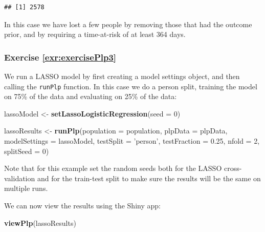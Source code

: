 \documentclass[11pt]{book}
\newenvironment{Shaded}{\begin{snugshade}}{\end{snugshade}}
\newcommand{\KeywordTok}[1]{\textcolor[rgb]{0.13,0.29,0.53}{\textbf{#1}}}
\newcommand{\DataTypeTok}[1]{\textcolor[rgb]{0.13,0.29,0.53}{#1}}
\newcommand{\DecValTok}[1]{\textcolor[rgb]{0.00,0.00,0.81}{#1}}
\newcommand{\FloatTok}[1]{\textcolor[rgb]{0.00,0.00,0.81}{#1}}
\newcommand{\StringTok}[1]{\textcolor[rgb]{0.31,0.60,0.02}{#1}}
\newcommand{\NormalTok}[1]{#1}
\theoremstyle{definition}
\theoremstyle{definition}
\theoremstyle{definition}
\theoremstyle{remark}
\begin{document}
\begin{verbatim}
## [1] 2578
\end{verbatim}

In this case we have lost a few people by removing those that had the
outcome prior, and by requiring a time-at-risk of at least 364 days.

\subsubsection*{Exercise
\ref{exr:exercisePlp3}}\label{exercise-refexrexerciseplp3}

We run a LASSO model by first creating a model settings object, and then
calling the \texttt{runPlp} function. In this case we do a person split,
training the model on 75\% of the data and evaluating on 25\% of the
data:

\begin{Shaded}
\begin{Highlighting}[]
\NormalTok{lassoModel <-}\StringTok{ }\KeywordTok{setLassoLogisticRegression}\NormalTok{(}\DataTypeTok{seed =} \DecValTok{0}\NormalTok{)}

\NormalTok{lassoResults <-}\StringTok{ }\KeywordTok{runPlp}\NormalTok{(}\DataTypeTok{population =}\NormalTok{ population, }
                       \DataTypeTok{plpData =}\NormalTok{ plpData, }
                       \DataTypeTok{modelSettings =}\NormalTok{ lassoModel, }
                       \DataTypeTok{testSplit =} \StringTok{'person'}\NormalTok{,}
                       \DataTypeTok{testFraction =} \FloatTok{0.25}\NormalTok{, }
                       \DataTypeTok{nfold =} \DecValTok{2}\NormalTok{, }
                       \DataTypeTok{splitSeed =} \DecValTok{0}\NormalTok{)}
\end{Highlighting}
\end{Shaded}

Note that for this example set the random seeds both for the LASSO
cross-validation and for the train-test split to make sure the results
will be the same on multiple runs.

We can now view the results using the Shiny app:

\begin{Shaded}
\begin{Highlighting}[]
\KeywordTok{viewPlp}\NormalTok{(lassoResults)}
\end{Highlighting}
\end{Shaded}
\end{document}
